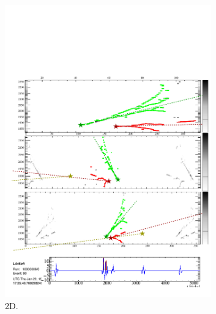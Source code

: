 \begin{figure}
  \centering
  \begin{subfigure}[t]{0.48\linewidth}
    \centering
    \includegraphics[width=0.98\textwidth]{EVDPi0Shower2D.pdf}
    \caption{2D.}
    \label{fig:pi0ShowersShowers2D}
  \end{subfigure}
  \hfill
  \begin{subfigure}[t]{0.48\linewidth}
    \centering

\end{subfigure}
\end{figure}
